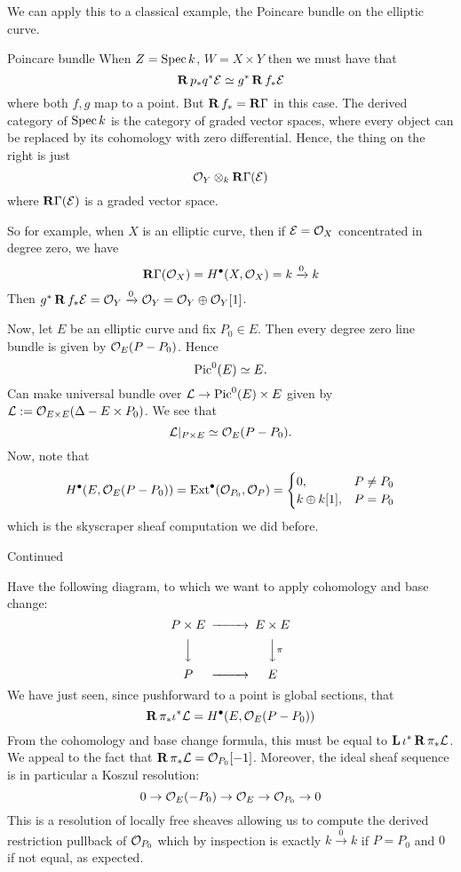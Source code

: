 We can apply this to a classical example, the Poincare bundle on the elliptic curve.
\begin{example}{Poincare bundle}{}
When $Z=\operatorname{Spec} k$, $W=X\times Y$ then we must have that $$\operatorname{\mathbf{R}} p_{*}q^* \mathcal{E}\simeq g^* \operatorname{\mathbf{R}} f_{*}\mathcal{E}$$where both $f,g$ map to a point. But $\operatorname{\mathbf{R}} f_{*}=\operatorname{\mathbf{R}\Gamma}$ in this case. The derived category of $\operatorname{Spec} k$ is the category of graded vector spaces, where every object can be replaced by its cohomology with zero differential. Hence, the thing on the right is just $$\mathcal{O}_{Y}\otimes_{k} \operatorname{\mathbf{R}\Gamma} (\mathcal{E})$$where $\operatorname{\mathbf{R}\Gamma}(\mathcal{E})$ is a graded vector space.

So for example, when $X$ is an elliptic curve, then if $\mathcal{E}=\mathcal{O}_{X}$ concentrated in degree zero, we have $$\operatorname{\mathbf{R}\Gamma}(\mathcal{O}_{X})=H^\bullet(X,\mathcal{O}_{X})=k\xrightarrow{0}k$$Then $g^* \operatorname{\mathbf{R}} f_*\mathcal{E}= \mathcal{O}_{Y}\xrightarrow{0}\mathcal{O}_{Y}= \mathcal{O}_{Y}\oplus \mathcal{O}_{Y}[1]$.

Now, let $E$ be an elliptic curve and fix $P_0\in E$. Then every degree zero line bundle is given by $\mathcal{O}_{E}(P-P_{0})$. Hence
$$\operatorname{Pic}^0(E)\simeq E.$$
Can make universal bundle over $\mathcal{L}\to  \operatorname{Pic}^0(E)\times E$ given by $\mathcal{L}:=\mathcal{O}_{E\times E}(\Delta-E\times P_{0})$. We see that
$$\mathcal{L}|_{P\times E}\simeq \mathcal{O}_{E}(P-P_{0}).$$
Now, note that
$$H^\bullet (E, \mathcal{O}_{E}(P-P_{0}))
    =\operatorname{Ext}^\bullet(\mathcal{O}_{P_{0}},\mathcal{O}_{P})
    =\begin{cases}0, & P\neq P_{0} \\ k\oplus k[1], & P=P_{0}\end{cases} $$
which is the skyscraper sheaf computation we did before.

\end{example}

\begin{example}{Continued}{}

Have the following diagram, to which we want to apply cohomology and base change: $$\begin{CD}
P\times E @> > > E\times E\\ @VVV @VV\pi V \\ P @> > > E
\end{CD}$$
We have just seen, since pushforward to a point is global sections, that$$\operatorname{\mathbf{R}} \pi_{*}\iota^*\mathcal{L}=H^\bullet(E, \mathcal{O}_{E}(P-P_{0}))$$From the cohomology and base change formula, this must be equal to $\operatorname{\mathbf{L}} \iota^*\operatorname{\mathbf{R}} \pi_{*}\mathcal{L}$. We appeal to the fact that $\operatorname{\mathbf{R}} \pi_{*}\mathcal{L}=\mathcal{O}_{P_{0}}[-1]$. Moreover, the ideal sheaf sequence is in particular a Koszul resolution: $$0\rightarrow \mathcal{O}_{E}(-P_{0})\to \mathcal{O}_{E}\to \mathcal{O}_{{P_{0}}}\to 0$$This is a resolution of locally free sheaves allowing us to compute the derived restriction pullback of $\mathcal{O}_{{P}_{0}}$ which by inspection is exactly $k\xrightarrow{0}k$ if $P=P_0$ and $0$ if not equal, as expected.


\end{example}

